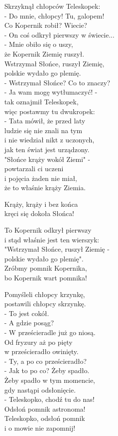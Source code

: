 \documentclass[11pt,a4pape,leqno,twoside]{book}
\begin{document}
Skrzyknął chłopców Teleskopek:\\
- Do mnie, chłopcy! Tu, galopem!\\
Co Kopernik robił? Wiecie?\\
- On coś odkrył pierwszy w świecie...\\
- Mnie obiło się o uszy,\\
że Kopernik Ziemię ruszył.\\
Wstrzymał Słońce, ruszył Ziemię,\\
polskie wydało go plemię.\\
- Wstrzymał Słońce? Co to znaczy?\\
- Ja wam mogę wytłumaczyć! -\\
tak oznajmił Teleskopek,\\
więc postawmy tu dwukropek:\\
- Tata mówił, że przed laty\\
ludzie się nie znali na tym\\
i nie wiedział nikt z uczonych,\\
jak ten świat jest urządzony.\\
"Słońce krąży wokół Ziemi" -\\
powtarzali ci uczeni\\
i pojęcia żaden nie miał,\\
że to właśnie krąży Ziemia.\\ \vspace{0.1cm}

Krąży, krąży i bez końca\\
kręci się dokoła Słońca!\\ \vspace{0.1cm}

To Kopernik odkrył pierwszy\\
i stąd właśnie jest ten wierszyk:\\
"Wstrzymał Słońce, ruszył Ziemię -\\
polskie wydało go plemię".\\
Zróbmy pomnik Kopernika,\\
bo Kopernik wart pomnika!\\ \vspace{0.1cm}

Pomyśleli chłopcy krzynkę,\\
postawili chłopcy skrzynkę.\\
- To jest cokół.\\
- A gdzie posąg?\\
- W prześcieradle już go niosą.\\
Od fryzury aż po pięty\\
w prześcieradło owinięty.\\
- Ty, a po co prześcieradło?\\
- Jak to po co? Żeby spadło.\\
Żeby spadło w tym momencie,\\
gdy nastąpi odsłonięcie.\\
- Teleskopko, chodź tu do nas!\\
Odsłoń pomnik astronoma!\\
Teleskopko, odsłoń pomnik\\
i o mowie nie zapomnij!\\ \vspace{0.1cm}
\end{document}
